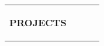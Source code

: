 \documentclass[10pt,a4]{article}
\begin{document}
{\begin{tabu}
\begin{center}
\begin{tabular} {p{} p{} p{} p{}}
\begin{flushleft}
    {\Large \textbf{PROJECTS}}
        \vspace{0.5mm}
            
        



\end{flushleft}
\end{tabular}
\end{center}
\end{tabu}}
\end{document}
